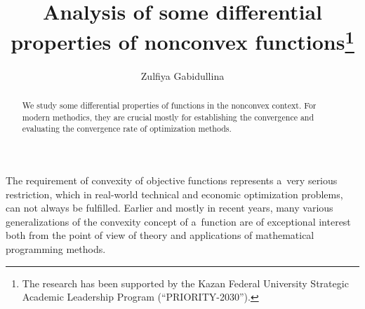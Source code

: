 \documentclass[12pt]{llncs}
\begin{document}
\fi

%
\title{Analysis of some  differential properties of nonconvex functions\thanks{The research has been supported by the Kazan Federal University Strategic Academic Leadership Program (``PRIORITY-2030'').}}
\author{Zulfiya Gabidullina %
}

\maketitle

\begin{abstract} 
	We study some differential properties of functions in the nonconvex context. For modern methodics, they are crucial  mostly for establishing the convergence and evaluating the convergence rate of optimization methods.

\end{abstract}


	The requirement of convexity of objective functions represents a~very serious restriction, which in real-world
	technical and economic optimization problems,  can not always be fulfilled.
	Earlier and mostly in recent years, many various generalizations of the convexity concept  of a~func\-tion
	are of exceptional interest both from the point of view of theory 
	and applications of mathematical programming methods.
	
\end{document}
